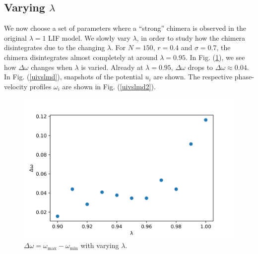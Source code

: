 \documentclass[a4paper,12pt]{article}
\begin{document}
\subsection{Varying $\lambda$}
We now choose a set of parameters where a ``strong'' chimera is observed in the original $\lambda = 1$ LIF model. We slowly vary $\lambda$, in order to study how the chimera disintegrates due to the changing $\lambda$. For $N=150$, $r=0.4$ and $\sigma = 0.7$, the chimera disintegrates almost completely at around $\lambda = 0.95$. In Fig. (\ref{vslmd}), we see how $\Delta \omega$ changes when $\lambda$ is varied. Already at $\lambda=0.95$, $\Delta \omega$ drops to $\Delta \omega  \approx 0.04$. In Fig. (\ref{uivslmd}), snapshots of the potential $u_i$ are shown. The respective phase-velocity profiles $\omega_i$ are shown in Fig. (\ref{uivslmd2}).

\begin{figure}[H]
\centering
\includegraphics[width = 0.6 \textwidth]{deltawvslmd.png}
\caption{$\Delta \omega = \omega_{\text{max}}-\omega_{\text{min}}$ with varying $\lambda$.}
\label{vslmd}
\end{figure}
\end{document}
